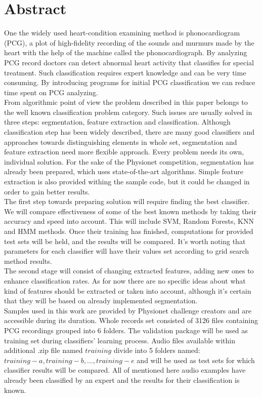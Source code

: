 \documentclass[10pt,a4paper]{article}
\begin{document}
\section{Abstract}
One the widely used heart-condition examining method is phonocardiogram (PCG), a plot of high-fidelity recording of the sounds and murmurs made by the heart with the help of the machine called the phonocardiograph. By analyzing PCG record doctors can detect abnormal heart activity that classifies for special treatment. Such classification requires expert knowledge and can be very time consuming. By introducing programs for initial PCG classification we can reduce time spent on PCG analyzing. \\

From algorithmic point of view the problem described in this paper belongs to the well known classification problem category. Such issues are usually solved in three steps: segmentation, feature extraction and classification. Although classification step has been widely described, there are many good classifiers and approaches towards distinguishing elements in whole set, segmentation and feature extraction need more flexible approach. Every problem needs its own, individual solution. For the sake of the Physionet competition, segmentation has already been prepared, which uses state-of-the-art algorithms. Simple feature extraction is also provided withing the sample code, but it could be changed in order to gain better results. \\

The first step towards preparing solution will require finding the best classifier. We will compare effectiveness of some of the best known methods by taking their accuracy and speed into account. This will include SVM, Random Forests, KNN and HMM methods. Once their training has finished, computations for provided test sets will be held, and the results will be compared. It's worth noting that parameters for each classifier will have their values set according to grid search method results. \\

The second stage will consist of changing extracted features, adding new ones to enhance classification rates. As for now there are no specific ideas about what kind of features should be extracted or taken into account, although it's certain that they will be based on already implemented segmentation. \\

Samples used in this work are provided by Physionet challenge creators and are accessible during its duration. Whole records set consisted of 3126 files containing PCG recordings grouped into 6 folders. The validation package will be used as training set during classifiers' learning process. Audio files available within additional .zip file named $training$ divide into 5 folders named: $training-a, training-b, \dots, training-e$ and will be used as test sets for which classifier results will be compared. All of mentioned here audio examples have already been classified by an expert and the results for their classification is known.
\end{document}
